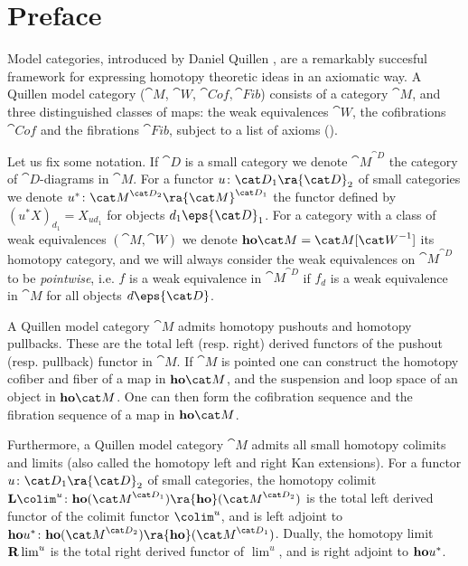 \chapter*{Preface}
\label{chap:Introduction}

Model categories, introduced by Daniel Quillen \cite{Quillen1}, are a remarkably succesful framework for expressing homotopy theoretic ideas in an axiomatic way. A Quillen model category (${\cat M}$, ${\cat W}$, ${\cat Cof}, {\cat Fib}$) consists of a category ${\cat M}$, and three distinguished classes of maps: the weak equivalences ${\cat W}$, the cofibrations ${\cat Cof}$ and the fibrations ${\cat Fib}$, subject to a list of axioms (). 

Let us fix some notation. If ${\cat D}$ is a small category we denote ${\cat M}^{\cat D}$ the category of ${\cat D}$-diagrams in ${\cat M}$. For a functor $u \colon {\cat D}_1 \ra {\cat D}_2$ of small categories we denote $u^* \colon {\cat M}^{{\cat D}_2} \ra {\cat M}^{{\cat D}_1}$ the functor defined by $(u^*X)_{d_1} = X_{ud_1}$ for objects $d_1 \eps {\cat D}_1$.  For a category with a class of weak equivalences $({\cat M}, {\cat W})$ we denote ${\bf ho}{\cat M} = {\cat M}[{\cat W}^{-1}]$ its homotopy category, and we will always consider the weak equivalences on ${\cat M}^{\cat D}$ to be {\it pointwise}, i.e. $f$ is a weak equivalence in ${\cat M}^{\cat D}$ if $f_d$ is a weak equivalence in ${\cat M}$ for all objects $d \eps {\cat D}$.

A Quillen model category ${\cat M}$ admits homotopy pushouts and homotopy pullbacks. These are the total left (resp. right) derived functors of the pushout (resp. pullback) functor in ${\cat M}$. If ${\cat M}$ is pointed one can construct the homotopy cofiber and fiber of a map in ${\bf ho}{\cat M}$, and the suspension and loop space of an object in ${\bf ho}{\cat M}$. One can then form the cofibration sequence and the fibration sequence of a map in ${\bf ho}{\cat M}$.

Furthermore, a Quillen model category ${\cat M}$ admits all small homotopy colimits and limits (also called the homotopy left and right Kan extensions). For a functor $u \colon {\cat D}_1 \ra {\cat D}_2$ of small categories, the homotopy colimit ${\bf L}\colim^u \colon {\bf ho}({\cat M}^{{\cat D}_1}) \ra {\bf ho}({\cat M}^{{\cat D}_2})$ is the total left derived functor of the colimit functor $\colim^u$, and is left adjoint to ${\bf ho}u^* \colon {\bf ho}({\cat M}^{{\cat D}_2}) \ra {\bf ho}({\cat M}^{{\cat D}_1})$. Dually, the homotopy limit ${\bf R}\lim^u$ is the total right derived functor of $\lim^u$, and is right adjoint to ${\bf ho}u^*$.

